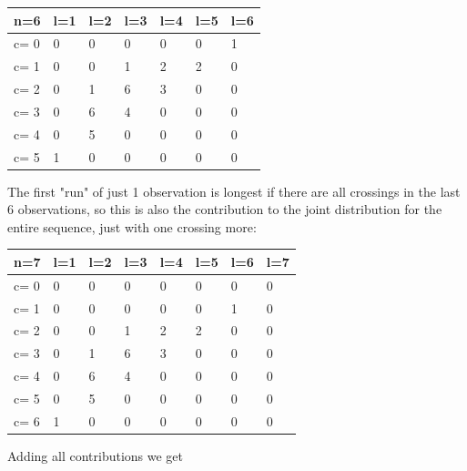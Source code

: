 \begin{tabular}{l | l l l l l l}
\hline
n=6&l=1&l=2&l=3&l=4&l=5&l=6\\
\hline
c= 0& 0& 0& 0& 0& 0& 1\\
c= 1& 0& 0& 1& 2& 2& 0\\
c= 2& 0& 1& 6& 3& 0& 0\\
c= 3& 0& 6& 4& 0& 0& 0\\
c= 4& 0& 5& 0& 0& 0& 0\\
c= 5& 1& 0& 0& 0& 0& 0\\
\hline
\end{tabular}

The first "run" of just 1 observation is longest if there are all crossings in the last 6 observations, so this is also the contribution to the joint distribution for the entire sequence, just with one crossing more: 

\begin{tabular}{l | l l l l l l l}
\hline
n=7&l=1&l=2&l=3&l=4&l=5&l=6&l=7\\
\hline
c= 0& 0& 0& 0& 0& 0& 0& 0\\
c= 1& 0& 0& 0& 0& 0& 1& 0\\
c= 2& 0& 0& 1& 2& 2& 0& 0\\
c= 3& 0& 1& 6& 3& 0& 0& 0\\
c= 4& 0& 6& 4& 0& 0& 0& 0\\
c= 5& 0& 5& 0& 0& 0& 0& 0\\
c= 6& 1& 0& 0& 0& 0& 0& 0\\
\hline
\end{tabular}

Adding all contributions we get

